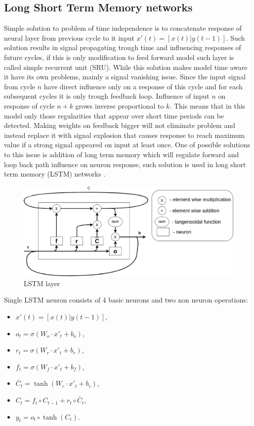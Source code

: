 \documentclass{kybernetika}
\begin{document}
\subsection{Long Short Term Memory networks}
Simple solution to problem of time independence is to concatenate response of neural layer
from previous cycle to it input $x'(t)=[x(t)|y(t-1)]$.
Such solution results in signal propagating trough time and influencing responses of future cycles,
if this is only modification to feed forward model such layer is called simple recurrent
unit (SRU).
While this solution makes model time aware it have its own problems, mainly a signal vanishing
issue. Since the input signal from cycle $n$ have direct influence only on a response of this
cycle and for each subsequent cycles it is only trough feedback loop. Influence of input $n$ on
response of cycle $n+k$ grows inverse proportional to $k$.
This means that in this model only those regularities that appear over short time periods can
be detected.
Making weights on feedback bigger will not eliminate problem and instead replace it with signal
explosion that causes response to reach maximum value if a strong signal appeared on input at
least once.
One of possible solutions to this issue is addition of long term memory which will regulate
forward and loop back path influence on neuron response, such solution is used in long short
term memory (LSTM) networks \cite{Hochreiter1997}.
\begin{figure}[htb] 
\centering
	\includegraphics[width=\textwidth]{figures/lstm}
\caption{LSTM layer}
\label{fig:lstm}
\end{figure}
Single LSTM neuron consists of 4 basic neurons and two non neuron operations:
\begin{itemize}
\item $x'(t)=[x(t)|y(t-1)]$,
\item $o_t=\sigma (W_o\cdot x'_t+b_o)$,
\item $r_t=\sigma (W_r\cdot x'_t+b_r)$,
\item $f_t=\sigma (W_f\cdot x'_t+b_f)$,
\item $\bar{C}_t=\tanh (W_c\cdot x'_t+b_c)$,
\item $C_t=f_t\circ C_{t-1}+r_t\circ \bar{C}_t$,
\item $y_t=o_t\circ \tanh (C_t)$.
\end{itemize}
\end{document}
